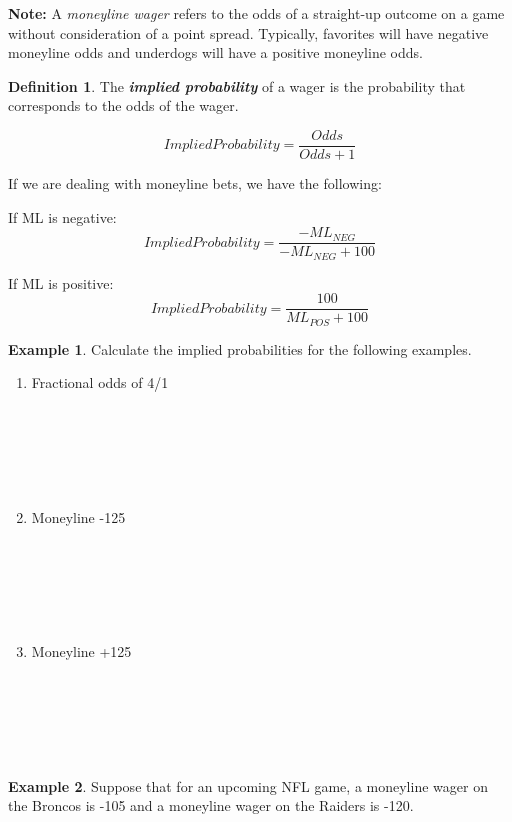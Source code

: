 \documentclass[
  11pt,
]{book}
\theoremstyle{definition}
\newtheorem{definition}{Definition}[chapter]
\theoremstyle{definition}
\newtheorem{example}{Example}[chapter]
\theoremstyle{definition}
\theoremstyle{definition}
\theoremstyle{remark}
\begin{document}
\textbf{Note:} A \emph{moneyline wager} refers to the odds of a straight-up outcome on a game without consideration of a point spread. Typically, favorites will have negative moneyline odds and underdogs will have a positive moneyline odds.

\begin{definition}
The \textbf{\emph{implied probability}} of a wager is the probability that corresponds to the odds of the wager.

\[Implied Probability = \frac{Odds}{Odds+1}\]

If we are dealing with moneyline bets, we have the following:

If ML is negative:
\[Implied Probability = \frac{-ML_{NEG}}{-ML_{NEG}+100}\]

If ML is positive:
\[Implied Probability = \frac{100}{ML_{POS}+100}\]
\end{definition}

\begin{example}
Calculate the implied probabilities for the following examples.
\end{example}

\begin{enumerate}
\def\labelenumi{(\alph{enumi})}
\item
  Fractional odds of 4/1\\
  \strut \\
  \strut \\
  \strut \\
\item
  Moneyline -125\\
  \strut \\
  \strut \\
  \strut \\
\item
  Moneyline +125\\
  \strut \\
  \strut \\
  \strut \\
\end{enumerate}

\begin{example}
Suppose that for an upcoming NFL game, a moneyline wager on the Broncos is -105 and a moneyline wager on the Raiders is -120.
\end{example}
\end{document}
